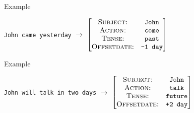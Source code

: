 \documentclass[11pt]{beamer}
\begin{document}
\begin{frame}
	\begin{block}{Example}
		\begin{center}
			\vspace{10pt}
				\texttt{John came yesterday} \small $\longrightarrow$ $\begin{bmatrix}
																				\textsc{Subject:}     & \texttt{John}\\ 
																				\textsc{Action:}      & \texttt{come}\\ 
																				\textsc{Tense:}     	& \texttt{past}\\ 
																				\textsc{Offsetdate:}  & \texttt{-1 day}\\ 
																			\end{bmatrix}$
			\vspace{10pt}
		\end{center}
	\end{block}
	\begin{block}{Example}
		\begin{center}
			\vspace{10pt}
				\texttt{John will talk in two days} \small $\longrightarrow$ $\begin{bmatrix}
																				\textsc{Subject:}     & \texttt{John}\\ 
																				\textsc{Action:}      & \texttt{talk}\\ 
																				\textsc{Tense:}     	& \texttt{future}\\ 
																				\textsc{Offsetdate:}  & \texttt{+2 day}\\ 
																			\end{bmatrix}$
			\vspace{10pt}
		\end{center}
	\end{block}
\end{frame}
\end{document}
